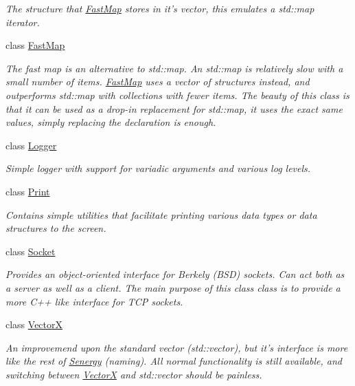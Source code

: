 \begin{DoxyCompactItemize}
\begin{DoxyCompactList}\small\item\em The structure that \hyperlink{class_senergy_1_1_fast_map}{Fast\-Map} stores in it's vector, this emulates a std\-::map iterator. \end{DoxyCompactList}\item 
class \hyperlink{class_senergy_1_1_fast_map}{Fast\-Map}
\begin{DoxyCompactList}\small\item\em The fast map is an alternative to std\-::map. An std\-::map is relatively slow with a small number of items. \hyperlink{class_senergy_1_1_fast_map}{Fast\-Map} uses a vector of structures instead, and outperforms std\-::map with collections with fewer items. The beauty of this class is that it can be used as a drop-\/in replacement for std\-::map, it uses the exact same values, simply replacing the declaration is enough. \end{DoxyCompactList}\item 
class \hyperlink{class_senergy_1_1_logger}{Logger}
\begin{DoxyCompactList}\small\item\em Simple logger with support for variadic arguments and various log levels. \end{DoxyCompactList}\item 
class \hyperlink{class_senergy_1_1_print}{Print}
\begin{DoxyCompactList}\small\item\em Contains simple utilities that facilitate printing various data types or data structures to the screen. \end{DoxyCompactList}\item 
class \hyperlink{class_senergy_1_1_socket}{Socket}
\begin{DoxyCompactList}\small\item\em Provides an object-\/oriented interface for Berkely (B\-S\-D) sockets. Can act both as a server as well as a client. The main purpose of this class class is to provide a more C++ like interface for T\-C\-P sockets. \end{DoxyCompactList}\item 
class \hyperlink{class_senergy_1_1_vector_x}{Vector\-X}
\begin{DoxyCompactList}\small\item\em An improvemend upon the standard vector (std\-::vector), but it's interface is more like the rest of \hyperlink{namespace_senergy}{Senergy} (naming). All normal functionality is still available, and switching between \hyperlink{class_senergy_1_1_vector_x}{Vector\-X} and std\-::vector should be painless. \end{DoxyCompactList}\end{DoxyCompactItemize}
